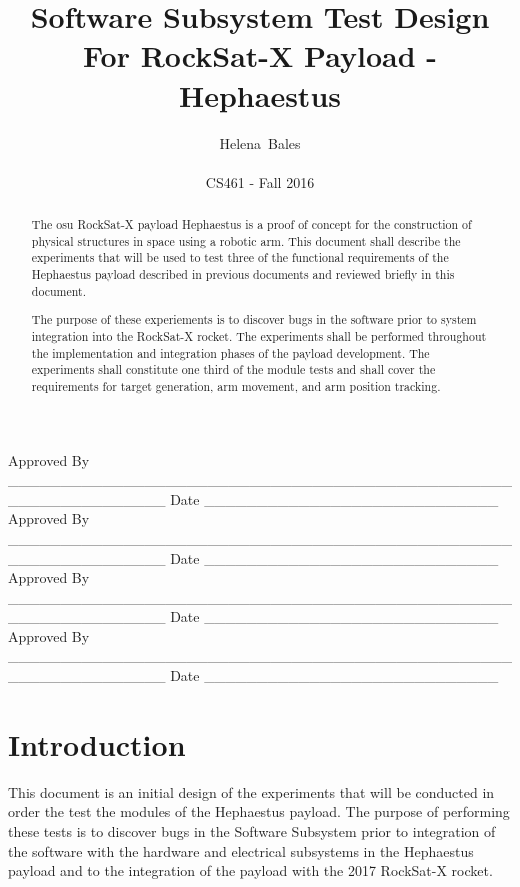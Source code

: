 \documentclass[letterpaper,10pt]{article}
\title{Software Subsystem Test Design For RockSat-X Payload - Hephaestus}
\author{Helena~Bales\\ \\ CS461 - Fall 2016}
\newenvironment{bottompar}{\par\vspace*{\fill}}{\clearpage}
\begin{document}
\maketitle

\begin{abstract}
The \gls{osu} RockSat-X payload Hephaestus is a proof of concept for the 
construction of physical structures in space using a robotic arm. 
This document shall describe the experiments that will be used to test three of 
the functional requirements of the Hephaestus payload described in previous 
documents and reviewed briefly in this document.

The purpose of these experiements is to discover bugs in the software prior to 
system integration into the RockSat-X rocket. The experiments shall be performed 
throughout the implementation and integration phases of the payload development. 
The experiments shall constitute one third of the module tests and shall cover 
the requirements for target generation, arm movement, and arm position tracking.
\end{abstract}

\begin{bottompar}
Approved By
\_\_\_\_\_\_\_\_\_\_\_\_\_\_\_\_\_\_\_\_\_\_\_\_\_\_\_\_\_\_\_\_\_\_\_\_\_\_\_\_\_\_\_\_\_\_\_\_\_\_\_\_\_\_\_\_\_\_\_\_\_\_\_
Date \_\_\_\_\_\_\_\_\_\_\_\_\_\_\_\_\_\_\_\_\_\_\_\_\_\_\_\_ \\


Approved By
\_\_\_\_\_\_\_\_\_\_\_\_\_\_\_\_\_\_\_\_\_\_\_\_\_\_\_\_\_\_\_\_\_\_\_\_\_\_\_\_\_\_\_\_\_\_\_\_\_\_\_\_\_\_\_\_\_\_\_\_\_\_\_
Date \_\_\_\_\_\_\_\_\_\_\_\_\_\_\_\_\_\_\_\_\_\_\_\_\_\_\_\_ \\


Approved By
\_\_\_\_\_\_\_\_\_\_\_\_\_\_\_\_\_\_\_\_\_\_\_\_\_\_\_\_\_\_\_\_\_\_\_\_\_\_\_\_\_\_\_\_\_\_\_\_\_\_\_\_\_\_\_\_\_\_\_\_\_\_\_
Date \_\_\_\_\_\_\_\_\_\_\_\_\_\_\_\_\_\_\_\_\_\_\_\_\_\_\_\_ \\


Approved By
\_\_\_\_\_\_\_\_\_\_\_\_\_\_\_\_\_\_\_\_\_\_\_\_\_\_\_\_\_\_\_\_\_\_\_\_\_\_\_\_\_\_\_\_\_\_\_\_\_\_\_\_\_\_\_\_\_\_\_\_\_\_\_
Date \_\_\_\_\_\_\_\_\_\_\_\_\_\_\_\_\_\_\_\_\_\_\_\_\_\_\_\_ \\
\end{bottompar}

\clearpage
\tableofcontents
\clearpage

\section{Introduction}
This document is an initial design of the experiments that will be conducted in 
order the test the modules of the Hephaestus payload. The purpose of performing 
these tests is to discover bugs in the Software Subsystem prior to integration 
of the software with the hardware and electrical subsystems in the Hephaestus 
payload and to the integration of the payload with the 2017 RockSat-X rocket. 
\end{document}
